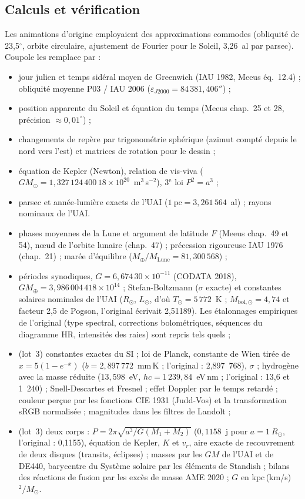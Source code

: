 \subsection{Calculs et vérification}
Les animations d'origine employaient des approximations commodes (obliquité de 23,5$^\circ$, orbite circulaire,
ajustement de Fourier pour le Soleil, 3,26~al par parsec). Coupole les remplace par :
\begin{itemize}
\item jour julien et temps sidéral moyen de Greenwich (IAU 1982, Meeus éq.~12.4) ; obliquité moyenne P03 / IAU 2006
      ($\varepsilon_{J2000}=84\,381{,}406''$) ;
\item position apparente du Soleil et équation du temps (Meeus chap.~25 et 28, précision $\approx 0{,}01^\circ$) ;
\item changements de repère par trigonométrie sphérique (azimut compté depuis le nord vers l'est) et matrices de
      rotation pour le dessin ;
\item équation de Kepler (Newton), relation de vis-viva ($GM_\odot = 1{,}327\,124\,400\,18\times10^{20}$~m$^3$\,s$^{-2}$),
      3$^\text{e}$ loi $P^2=a^3$ ;
\item parsec et année-lumière exacts de l'UAI ($1~\mathrm{pc}=3{,}261\,564$~al) ; rayons nominaux de l'UAI.
\item phases moyennes de la Lune et argument de latitude $F$ (Meeus chap.~49 et 54), nœud de l'orbite lunaire
      (chap.~47) ; précession rigoureuse IAU 1976 (chap.~21) ; marée d'équilibre ($M_\oplus/M_{\mathrm{Lune}}=81{,}300\,568$) ;
\item périodes synodiques, $G=6{,}674\,30\times10^{-11}$ (CODATA 2018), $GM_\oplus=3{,}986\,004\,418\times10^{14}$ ;
      Stefan-Boltzmann ($\sigma$ exacte) et constantes solaires nominales de l'UAI ($R_\odot$, $L_\odot$, d'où
      $T_\odot=5\,772$~K ; $M_{\text{bol},\odot}=4{,}74$ et facteur 2,5 de Pogson, l'original écrivait 2,51189). Les
      étalonnages empiriques de l'original (type spectral, corrections bolométriques, séquences du diagramme HR,
      intensités des raies) sont repris tels quels ;
\item (lot~3) constantes exactes du SI ; loi de Planck, constante de Wien tirée de $x=5(1-e^{-x})$
      ($b=2{,}897\,772$~mm\,K ; l'original : 2,897~768), $\sigma$ ; hydrogène avec la masse réduite
      ($13{,}598$~eV, $hc=1\,239{,}84$~eV\,nm ; l'original : 13,6 et 1~240) ; Snell-Descartes et Fresnel ; effet
      Doppler par le temps retardé ; couleur perçue par les fonctions CIE 1931 (Judd-Vos) et la transformation sRGB
      normalisée ; magnitudes dans les filtres de Landolt ;
\item (lot~3) deux corps : $P=2\pi\sqrt{a^3/G(M_1+M_2)}$ ($0{,}1158$~j pour $a=1~R_\odot$, l'original : 0,1155),
      équation de Kepler, $K$ et $v_r$, aire exacte de recouvrement de deux disques (transits, éclipses) ; masses par
      les $GM$ de l'UAI et de DE440, barycentre du Système solaire par les éléments de Standish ; bilans des réactions
      de fusion par les excès de masse AME 2020 ; $G$ en kpc\,(km/s)$^2/M_\odot$.
\end{itemize}
